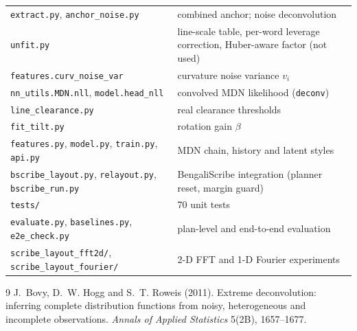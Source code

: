 \documentclass[11pt,a4paper]{article}
\begin{document}
\begin{center}\small
\begin{tabular}{p{7.2cm}p{8.0cm}}
\toprule
\texttt{extract.py}, \texttt{anchor\_noise.py} & combined anchor; noise deconvolution\\
\texttt{unfit.py} & line-scale table, per-word leverage correction, Huber-aware factor (not used)\\
\texttt{features.curv\_noise\_var} & curvature noise variance $v_i$\\
\texttt{nn\_utils.MDN.nll}, \texttt{model.head\_nll} & convolved MDN likelihood (\texttt{deconv})\\
\texttt{line\_clearance.py} & real clearance thresholds\\
\texttt{fit\_tilt.py} & rotation gain $\beta$\\
\texttt{features.py}, \texttt{model.py}, \texttt{train.py}, \texttt{api.py} & MDN chain, history and latent styles\\
\texttt{bscribe\_layout.py}, \texttt{relayout.py}, \texttt{bscribe\_run.py} & BengaliScribe integration (planner reset, margin guard)\\
\texttt{tests/} & 70 unit tests\\
\texttt{evaluate.py}, \texttt{baselines.py}, \texttt{e2e\_check.py} & plan-level and end-to-end evaluation\\
\texttt{scribe\_layout\_fft2d/}, \texttt{scribe\_layout\_fourier/} & 2-D FFT and 1-D Fourier experiments\\
\bottomrule
\end{tabular}
\end{center}

\begin{thebibliography}{9}
J.~Bovy, D.~W. Hogg and S.~T. Roweis (2011).
Extreme deconvolution: inferring complete distribution functions from noisy,
heterogeneous and incomplete observations.
\emph{Annals of Applied Statistics} 5(2B), 1657--1677.
\end{thebibliography}
\end{document}
